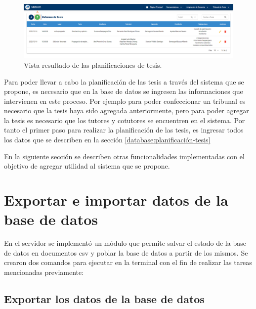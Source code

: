 \begin{figure}[H]
    \includegraphics[scale=0.3]{Graphics/Implementation/Tesis/thesis-defense-result.png}
    \caption{Vista resultado de las planificaciones de tesis.}
    \label{img-tc-thesis-defense-result}
\end{figure}




Para poder llevar a cabo la planificación de las tesis a través
del sistema que se propone, es necesario que en la base de datos 
se ingresen las informaciones que intervienen en este proceso. Por ejemplo 
para poder confeccionar un tribunal es necesario que la tesis haya sido agregada 
anteriormente, pero para poder agregar la tesis es necesario que los tutores y 
cotutores se encuentren en el sistema. Por tanto el primer paso 
para realizar la planificación de las tesis, es ingresar todos los datos que se describen 
en la sección \ref{database:planificación-tesis}


En la siguiente sección se describen otras funcionalidades implementadas 
con el objetivo de agregar utilidad al sistema que se propone.

\section{Exportar e importar datos de la base de datos}\label{cap4:csv}

En el servidor se implementó un módulo 
que permite salvar el estado de la base de datos 
en documentos csv y poblar la base de datos a partir de los mismos.
Se crearon dos comandos para ejecutar en la terminal con el 
fin de realizar las tareas mencionadas previamente:

\subsection{Exportar los datos de la base de datos}

